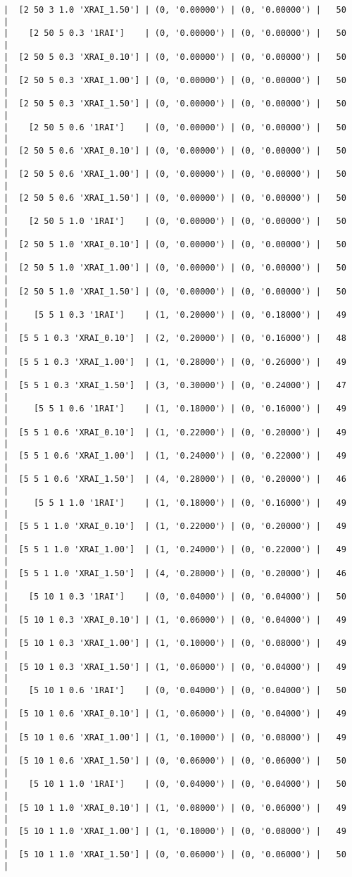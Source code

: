 \documentclass{article}
\begin{document}
\begin{verbatim}
|  [2 50 3 1.0 'XRAI_1.50'] | (0, '0.00000') | (0, '0.00000') |   50  |
|    [2 50 5 0.3 '1RAI']    | (0, '0.00000') | (0, '0.00000') |   50  |
|  [2 50 5 0.3 'XRAI_0.10'] | (0, '0.00000') | (0, '0.00000') |   50  |
|  [2 50 5 0.3 'XRAI_1.00'] | (0, '0.00000') | (0, '0.00000') |   50  |
|  [2 50 5 0.3 'XRAI_1.50'] | (0, '0.00000') | (0, '0.00000') |   50  |
|    [2 50 5 0.6 '1RAI']    | (0, '0.00000') | (0, '0.00000') |   50  |
|  [2 50 5 0.6 'XRAI_0.10'] | (0, '0.00000') | (0, '0.00000') |   50  |
|  [2 50 5 0.6 'XRAI_1.00'] | (0, '0.00000') | (0, '0.00000') |   50  |
|  [2 50 5 0.6 'XRAI_1.50'] | (0, '0.00000') | (0, '0.00000') |   50  |
|    [2 50 5 1.0 '1RAI']    | (0, '0.00000') | (0, '0.00000') |   50  |
|  [2 50 5 1.0 'XRAI_0.10'] | (0, '0.00000') | (0, '0.00000') |   50  |
|  [2 50 5 1.0 'XRAI_1.00'] | (0, '0.00000') | (0, '0.00000') |   50  |
|  [2 50 5 1.0 'XRAI_1.50'] | (0, '0.00000') | (0, '0.00000') |   50  |
|     [5 5 1 0.3 '1RAI']    | (1, '0.20000') | (0, '0.18000') |   49  |
|  [5 5 1 0.3 'XRAI_0.10']  | (2, '0.20000') | (0, '0.16000') |   48  |
|  [5 5 1 0.3 'XRAI_1.00']  | (1, '0.28000') | (0, '0.26000') |   49  |
|  [5 5 1 0.3 'XRAI_1.50']  | (3, '0.30000') | (0, '0.24000') |   47  |
|     [5 5 1 0.6 '1RAI']    | (1, '0.18000') | (0, '0.16000') |   49  |
|  [5 5 1 0.6 'XRAI_0.10']  | (1, '0.22000') | (0, '0.20000') |   49  |
|  [5 5 1 0.6 'XRAI_1.00']  | (1, '0.24000') | (0, '0.22000') |   49  |
|  [5 5 1 0.6 'XRAI_1.50']  | (4, '0.28000') | (0, '0.20000') |   46  |
|     [5 5 1 1.0 '1RAI']    | (1, '0.18000') | (0, '0.16000') |   49  |
|  [5 5 1 1.0 'XRAI_0.10']  | (1, '0.22000') | (0, '0.20000') |   49  |
|  [5 5 1 1.0 'XRAI_1.00']  | (1, '0.24000') | (0, '0.22000') |   49  |
|  [5 5 1 1.0 'XRAI_1.50']  | (4, '0.28000') | (0, '0.20000') |   46  |
|    [5 10 1 0.3 '1RAI']    | (0, '0.04000') | (0, '0.04000') |   50  |
|  [5 10 1 0.3 'XRAI_0.10'] | (1, '0.06000') | (0, '0.04000') |   49  |
|  [5 10 1 0.3 'XRAI_1.00'] | (1, '0.10000') | (0, '0.08000') |   49  |
|  [5 10 1 0.3 'XRAI_1.50'] | (1, '0.06000') | (0, '0.04000') |   49  |
|    [5 10 1 0.6 '1RAI']    | (0, '0.04000') | (0, '0.04000') |   50  |
|  [5 10 1 0.6 'XRAI_0.10'] | (1, '0.06000') | (0, '0.04000') |   49  |
|  [5 10 1 0.6 'XRAI_1.00'] | (1, '0.10000') | (0, '0.08000') |   49  |
|  [5 10 1 0.6 'XRAI_1.50'] | (0, '0.06000') | (0, '0.06000') |   50  |
|    [5 10 1 1.0 '1RAI']    | (0, '0.04000') | (0, '0.04000') |   50  |
|  [5 10 1 1.0 'XRAI_0.10'] | (1, '0.08000') | (0, '0.06000') |   49  |
|  [5 10 1 1.0 'XRAI_1.00'] | (1, '0.10000') | (0, '0.08000') |   49  |
|  [5 10 1 1.0 'XRAI_1.50'] | (0, '0.06000') | (0, '0.06000') |   50  |

\end{verbatim}
\end{document}
